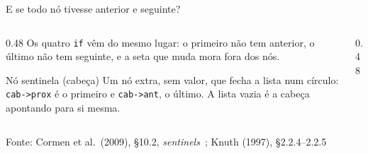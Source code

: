 \documentclass[aspectratio=169]{beamer}
\newcommand{\dno}[4][UFSBlue]{%
  \node[cel, draw=#1, anchor=west] (#2a) at #3 {};
  \node[celv, draw=#1, fill=#1!8, right=0pt of #2a] (#2v) {#4};
  \node[cel, draw=#1, right=0pt of #2v] (#2p) {};
}
\newcommand{\vai}[3][seta]{\draw[#1] ($(#2p.center)+(0,0.1)$) -- ($(#3a.west)+(0,0.1)$);}
\newcommand{\volta}[3][seta]{\draw[#1] ($(#3a.center)+(0,-0.1)$) -- ($(#2p.east)+(0,-0.1)$);}
\newcommand{\liga}[2]{\vai{#1}{#2}\volta{#1}{#2}}
\newcommand{\fonte}[1]{\vfill\hfill{\scriptsize\textcolor{UFSGray}{Fonte: #1}}}
\begin{document}
\begin{frame}{E se todo nó tivesse anterior e seguinte?}
  \begin{columns}[T]
    \begin{column}{0.48\textwidth}
      \small
      Os quatro \texttt{if} vêm do mesmo lugar: o primeiro não tem
      anterior, o último não tem seguinte, e a seta que muda mora fora dos
      nós.

      \begin{block}{Nó sentinela (cabeça)}
        \small Um nó extra, sem valor, que fecha a lista num círculo:
        \texttt{cab->prox} é o primeiro e \texttt{cab->ant}, o último. A
        lista vazia é a cabeça apontando para si mesma.
      \end{block}
    \end{column}
    \begin{column}{0.48\textwidth}
      \begin{center}
      \end{center}
    \end{column}
  \end{columns}
  \fonte{Cormen et al.\ (2009), §10.2, \emph{sentinels}~\cite{cormen2009introduction};
    Knuth (1997), §2.2.4--2.2.5~\cite{knuth1997art}}
\end{frame}
\end{document}
